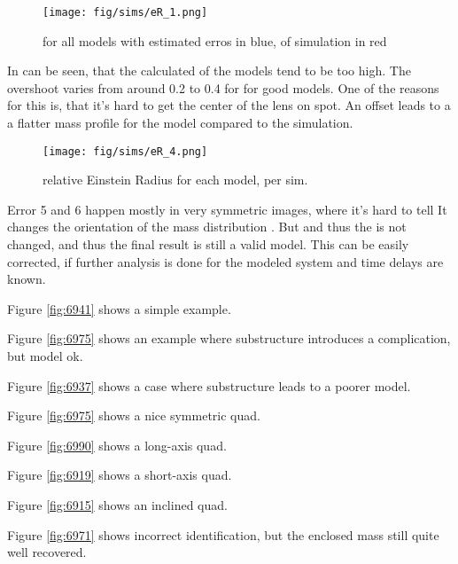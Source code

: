 \begin{figure}[htbp]
  \centering
    \texttt{[image: fig/sims/eR\_1.png]}
  \caption{\tEr \gEr for all models with estimated erros in blue, \gEr of simulation in red}
  \label{fig:eR_all_models}
\end{figure}

In  can be seen, that the calculated \tEr \gEr of the models tend to be too high.
The overshoot varies from around 0.2 to 0.4 for for good models.
One of the reasons for this is, that it's hard to get the center of the lens on spot.
An offset leads to a a flatter mass profile for the model compared to the simulation.



\begin{figure}[htbp]
  \centering
    \texttt{[image: fig/sims/eR\_4.png]}
  \caption{relative Einstein Radius for each model, per sim. }
  \label{fig:eR_per_sim}
\end{figure}


Error 5 and 6 happen mostly in very symmetric images, where it's hard to tell
It changes the orientation of the mass distribution \kap[x,y].
But \kenc and thus the \tEr \gEr is not changed, and thus the final result is still a valid model.
This can be easily corrected, if further analysis is done for the modeled system and time delays are known.


\hr

Figure \ref{fig:6941} shows a simple example.

Figure \ref{fig:6975} shows an example where substructure introduces a
complication, but model ok.

Figure \ref{fig:6937} shows a case where substructure leads to a
poorer model.

Figure \ref{fig:6975} shows a nice symmetric quad.

Figure \ref{fig:6990} shows a long-axis quad.

Figure \ref{fig:6919} shows a short-axis quad.

Figure \ref{fig:6915} shows an inclined quad.

Figure \ref{fig:6971} shows incorrect identification, but the enclosed
mass still quite well recovered.




\clearpage
